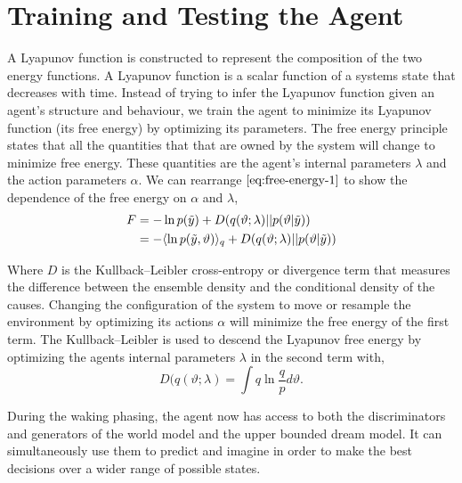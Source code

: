 \documentclass{article}
\begin{document}




\section{Training and Testing the Agent}

A Lyapunov function is constructed to represent the composition of the two energy functions. A Lyapunov function is a scalar function of a systems state that decreases with time. Instead of trying to infer the Lyapunov function given an agent's structure and behaviour, we train the agent to minimize its Lyapunov function (its free energy) by optimizing its parameters. The free energy principle states that all the quantities that that are owned by the system will change to minimize free energy. These quantities are the agent's internal parameters $\lambda$ and the action parameters $\alpha$. We can rearrange $\eqref{eq:free-energy-1}$ to show the dependence of the free energy on $\alpha$ and $\lambda$,
\begin{align}\label{eq:free-energy-2}
\begin{split}
F &= -\ln p (\Tilde{y}) + D(q(\vartheta;\lambda) || p(\vartheta|\Tilde{y}))\\
&=  - \langle \ln p(\Tilde{y},\vartheta) \rangle_q + D(q(\vartheta;\lambda) || p(\vartheta|\Tilde{y}))
\end{split}
\end{align}

Where $D$ is the Kullback–Leibler cross-entropy or divergence term that measures the difference between the ensemble density and the conditional density of the causes. Changing the configuration of the system to move or resample the environment by optimizing its actions $\alpha$ will minimize the free energy of the first term. The Kullback–Leibler is used to descend the Lyapunov free energy by optimizing the agents internal parameters $\lambda$ in the second term with,
\[
D(q(\vartheta;\lambda) = \int q \ln \frac{q}{p} d\vartheta.
\]

During the waking phasing, the agent now has access to both the discriminators and generators of the world model and the upper bounded dream model. It can simultaneously use them to predict and imagine in order to make the best decisions over a wider range of possible states.
\end{document}
